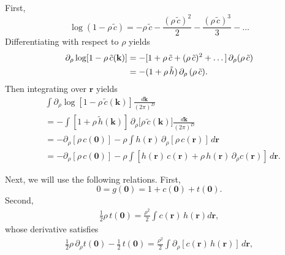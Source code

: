 \documentclass[preprint]{revtex4-1}
\numberwithin{equation}{subsection}
\numberwithin{table}{section}
\newcommand{\vct}[1]{\mathbf{#1}}
\providecommand{\vr}{} %
\renewcommand{\vr}{\vct{r}}
\newcommand{\vk}{\vct{k}}
\newcommand{\dvk}{\frac{d\vk}{(2\pi)^D}}
\begin{document}
First,
\[
\log(1 - \rho \, \tilde{c})
=
-\rho \, \tilde{c}
-\frac{ (\rho \, \tilde{c})^2 } 2
-\frac{ (\rho \, \tilde{c})^3 } 3
-\dots
\]
Differentiating with respect to $\rho$ yields
\begin{align*}
\partial_\rho \log[1 - \rho \, \tilde{c}(\vk)]
&=
-[1
  + \rho \, \tilde{c}
  + (\rho \, \tilde{c})^2
  + \dots
  ]
  \,
  \partial_\rho (\rho \, \tilde c)
  \notag \\
&=
-(1 + \rho \, \tilde h)
\, \partial_\rho \, (\rho \, \tilde c).
\end{align*}
%
Then integrating over $\vr$ yields
\begin{align*}
  & \int
    \partial_\rho \log[1 - \rho \, \tilde{c}(\vk)] \dvk \\
  &= -\int [1 + \rho \, \tilde{h}(\vk)] \,
    \partial_\rho \bigl[ \rho \, \tilde{c}(\vk) \bigr] \dvk \\
  &= -\partial_\rho[ \rho \, c(\vct 0) ]
  - \rho \int h(\vr) \, \partial_\rho [\rho \, c(\vr)] \, d\vr \\
  &= -\partial_\rho[ \rho \, c(\vct 0) ]
  - \rho \int
  [h(\vr) \, c(\vr) + \rho \, h(\vr) \, \partial_\rho c(\vr)] \, d\vr.
\end{align*}
%



Next,
we will use the following relations.
First,
\[
  0 = g(\vct0) = 1 + c(\vct0) + t(\vct0).
\]
Second,
\begin{align*}
  \frac{1}{2} \rho \, t(\vct{0})
   = \frac{\rho^2}{2} \int c(\vr) \, h(\vr) d\vr,
\end{align*}
whose derivative satisfies
\begin{align*}
  \frac{1}{2} \rho \, \partial_\rho t(\vct{0})
  - \frac{1}{2} \, t(\vct{0})
=
  \frac{\rho^2}{2} \int \partial_\rho[ c(\vr) \, h(\vr)] \, d\vr,
\end{align*}
\end{document}
